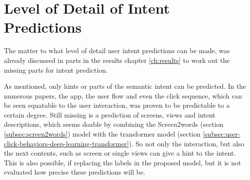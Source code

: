 \section{Level of Detail of Intent Predictions}

The matter to what level of detail user intent predictions can be made, was already discussed in parts in the results chapter \ref{ch:results} to work out the missing parts for intent prediction.

As mentioned, only hints or parts of the semantic intent can be predicted.
In the numerous papers, the app, the user flow and even the click sequence, which can be seen equatable to the user interaction, was proven to be predictable to a certain degree.
Still missing is a prediction of screens, views and intent descriptions, which seems doable by combining the Screen2words (section \ref{subsec:screen2words}) model with the transformer model (section \ref{subsec:user-click-behaviors-deep-learning-transformer}).
%
So not only the interaction, but also the next contents, such as screen or single views can give a hint to the intent.
This is also possible, if replacing the labels in the proposed model, but it is not evaluated how precise these predictions will be.


